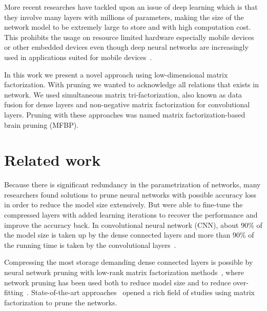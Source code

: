 \documentclass{article} %
\begin{document}
More recent researches have tackled upon an issue of deep learning which is 
that they involve many layers with
millions of parameters, making the size of the network model to be extremely
large to store and with high computation cost. This prohibits the usage on 
resource limited hardware
especially mobile devices or other embedded devices even though deep neural
networks are increasingly used in applications suited for mobile
devices~\cite{DBLP:journals/corr/GongLYB14}.

In this work we present a novel approach using low-dimensional matrix
factorization. With pruning we wanted to acknowledge all relations that exists 
in network.
We used simultaneous matrix tri-factorization, also known as data fusion for 
dense layers and non-negative matrix factorization for convolutional layers. 
Pruning with these approaches was named matrix
factorization-based brain pruning (MFBP).


\section{Related work}

Because there is significant redundancy in the parametrization of networks,
many researchers found solutions to prune neural networks with possible
accuracy loss in order to reduce the model size extensively. But were able to
fine-tune the compressed layers with added learning iterations to recover the
performance and improve the accuracy back. In convolutional neural network (CNN), 
about 90\% 
of the model size is taken up by the dense connected layers and more than 90\% 
of the running time is taken by the convolutional 
layers~\cite{zeiler2014visualizing}. 

Compressing the most storage demanding dense connected layers is possible by
neural network pruning with low-rank matrix factorization
methods~\cite{bondarenko2014artificial, schmidhuber2015deep, sainath2013low},
where network pruning has been used both to reduce model size and to reduce
over-fitting~\cite{han2015learning}. State-of-the-art 
approaches~\cite{lecun1989optimal, hassibi1993optimal} opened a rich field of 
studies using matrix factorization to prune the networks.
\end{document}
